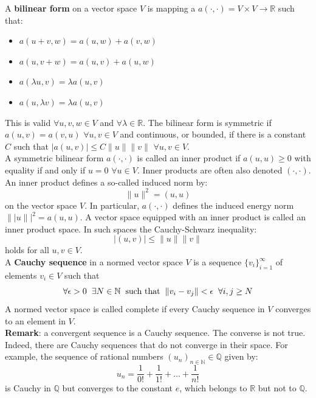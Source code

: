 A \textbf{bilinear form} on a vector space $V$ is mapping a $a(\cdot,\cdot) = V \times V \to \mathbb{R}$ such that:
\begin{itemize}
    \item $a(u+v,w) = a(u,w) + a(v,w)$
    \item $a(u,v+w) = a(u,v) + a(u,w)$
    \item $a(\lambda u, v) = \lambda a(u,v)$
    \item $a(u,\lambda v) = \lambda a(u,v)$
\end{itemize}
This is valid $\forall u,v,w \in V$ and $\forall \lambda \in \mathbb{R}$. The bilinear form is symmetric if $a(u,v) = a(v,u)$ $\forall u,v \in V$ and continuous, or bounded, if there is a constant $C$ such that $|a(u,v)| \leq C\|u\|\|v\|$ $\forall u,v \in V$.\\

A symmetric bilinear form $a(\cdot,\cdot)$ is called an inner product if $a(u,u) \geq 0$ with equality if and only if $u=0$ $\forall u \in V$. Inner products are often also denoted $(\cdot,\cdot)$. An inner product defines a so-called induced norm by:
\[
    \|u\|^2 = (u,u)    
\]
on the vector space $V$. In particular, $a(\cdot,\cdot)$ defines the induced energy norm $\||u\||^2 = a(u,u)$. A vector space equipped with an inner product is called an inner product space. In such spaces the Cauchy-Schwarz inequality:
\[
    |(u,v)| \leq \|u\|\|v\|    
\]
holds for all $u,v \in V$.\\

A \textbf{Cauchy sequence} in a normed vector space $V$ is a sequence $\{v_i\}^{\infty}_{i=1}$ of elements $v_i \in V$ such that
 \[
    \forall \epsilon > 0 \hspace{0.2cm} \exists N \in \mathbb{N} \hspace{0.2cm}\text{such that}\hspace{0.2cm} \|v_i - v_j\| < \epsilon \hspace{0.2cm}\forall i,j \geq N
\] 
A normed vector space is called complete if every Cauchy sequence in $V$ converges to an element in $V$.\\

\textbf{Remark}: a convergent sequence is a Cauchy sequence. The converse is not true. Indeed, there are Cauchy sequences that do not converge in their space. For example, the sequence of rational numbers $(u_n)_{n \in \mathbb{N}} \in \mathbb{Q}$ given by:
\[
    u_n = \dfrac{1}{0!} + \dfrac{1}{1!} + \dots + \dfrac{1}{n!}    
\]
is Cauchy in $\mathbb{Q}$ but converges to the constant $e$, which belongs to $\mathbb{R}$ but not to $\mathbb{Q}$.\\

